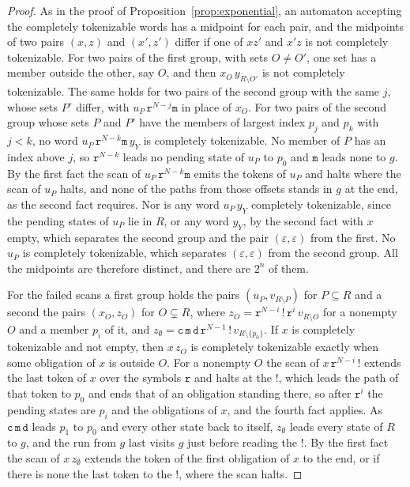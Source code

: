 \documentclass[11pt,a4paper]{article}
\theoremstyle{definition}
\theoremstyle{plain}
\newcommand{\code}[1]{\texttt{#1}}
\begin{document}
\begin{proof}
As in the proof of Proposition~\ref{prop:exponential}, an automaton accepting the completely tokenizable words has a
midpoint for each pair, and the midpoints of two pairs $(x, z)$ and $(x', z')$ differ if one of $xz'$ and $x'z$ is not
completely tokenizable. For two pairs of the first group, with sets $O \neq O'$, one set has a member outside the other,
say $O$, and then $x_O\,y_{R \setminus O'}$ is not completely tokenizable. The same holds for two pairs of the second
group with the same $j$, whose sets $P^\circ$ differ, with $u_P\,\code{r}^{N-j}\code{m}$ in place of $x_O$. For two
pairs of the second group whose sets $P$ and $P'$ have the members of largest index $p_j$ and $p_k$ with $j < k$, no
word $u_P\,\code{r}^{N-k}\code{m}\,y_Y$ is completely tokenizable. No member of $P$ has an index above $j$, so
$\code{r}^{N-k}$ leads no pending state of $u_P$ to $p_0$ and $\code{m}$ leads none to $g$. By the first fact the scan
of $u_P\,\code{r}^{N-k}\code{m}$ emits the tokens of $u_P$ and halts where the scan of $u_P$ halts, and none of the
paths from those offsets stands in $g$ at the end, as the second fact requires. Nor is any word $u_P\,y_Y$ completely
tokenizable, since the pending states of $u_P$ lie in $R$, or any word $y_Y$, by the second fact with $x$ empty, which
separates the second group and the pair $(\varepsilon, \varepsilon)$ from the first. No $u_P$ is completely tokenizable,
which separates $(\varepsilon, \varepsilon)$ from the second group. All the midpoints are therefore distinct, and there
are $2^n$ of them.

For the failed scans a first group holds the pairs $(u_P, v_{R \setminus P})$ for $P \subseteq R$ and a second the pairs
$(x_O, z_O)$ for $O \subsetneq R$, where $z_O = \code{r}^{N-i}\,\code{!}\,\code{r}^i\,v_{R \setminus O}$ for a nonempty
$O$ and a member $p_i$ of it, and
$z_\emptyset = \code{c}\,\code{m}\,\code{d}\,\code{r}^{N-1}\,\code{!}\,v_{R \setminus \{p_0\}}$. If $x$ is completely
tokenizable and not empty, then $x\,z_O$ is completely tokenizable exactly when some obligation of $x$ is outside $O$.
For a nonempty $O$ the scan of $x\,\code{r}^{N-i}\,\code{!}$ extends the last token of $x$ over the symbols $\code{r}$
and halts at the $\code{!}$, which leads the path of that token to $p_0$ and ends that of an obligation standing there,
so after $\code{r}^i$ the pending states are $p_i$ and the obligations of $x$, and the fourth fact applies. As
$\code{c}\,\code{m}\,\code{d}$ leads $p_1$ to $p_0$ and every other state back to itself, $z_\emptyset$ leads every
state of $R$ to $g$, and the run from $g$ last visits $g$ just before reading the $\code{!}$. By the first fact the scan
of $x\,z_\emptyset$ extends the token of the first obligation of $x$ to the end, or if there is none the last token to
the $\code{!}$, where the scan halts.


\end{proof}
\end{document}
